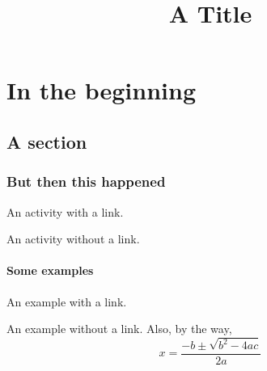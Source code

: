 \documentclass[phone]{screendoc}
\title{A Title}
\begin{document}
    \maketitle
    \chapter{In the beginning}
    \section{A section}
    \blindtext
    \subsection*{But then this happened}
    \blindtext
    \begin{activity}
        An activity with a link.
    \end{activity}
    \begin{activity}
        An activity without a link. 
    \end{activity}

    \subsubsection*{Some examples}
    \blindtext
    \begin{example}
        An example with a link. 
    \end{example}
    \begin{example}
        An example without a link. Also, by the way, 
        \[ x = \frac{-b \pm \sqrt{b^2 - 4ac}}{2a} \]
    \end{example}
    
\end{document}
